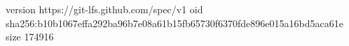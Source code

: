 version https://git-lfs.github.com/spec/v1
oid sha256:b10b1067effa292ba96b7e08a61b15fb65730f6370fde896e015a16bd5aca61e
size 174916
